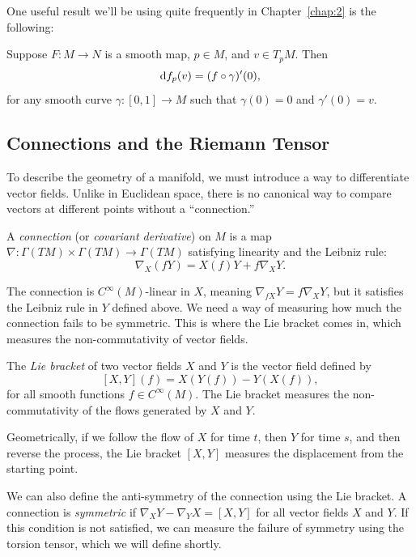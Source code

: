 
One useful result we'll be using quite frequently in Chapter~\ref{chap:2} is the following:

\begin{corollary}\label{cor:differential_of_a_map}
  Suppose $F : M \to N$ is a smooth map, $p \in M$, and $v \in T_pM$. Then
  \[%
    \df_p(v) = (f \circ \gamma)'(0)
  ,\]%
  for any smooth curve $\gamma : [0, 1] \to M$ such that $\gamma(0) = 0$ and $\gamma'(0) = v$.
\end{corollary}

\subsection{Connections and the Riemann Tensor} To describe the geometry of a manifold, we must introduce a way to differentiate vector fields. Unlike in Euclidean space, there is no canonical way to compare vectors at different points without a ``connection.''

\begin{definition}
  A \emph{connection} (or \emph{covariant derivative}) on $M$ is a map $\nabla : \Gamma(TM) \times \Gamma(TM) \to \Gamma(TM)$ satisfying linearity and the Leibniz rule:
  \[%
    \nabla_X (fY) = X(f) Y + f \nabla_X Y
  .\]%
\end{definition}

The connection is $C^\infty(M)$-linear in $X$, meaning $\nabla_{fX} Y = f\nabla_X Y$, but it satisfies the Leibniz rule in $Y$ defined above. We need a way of measuring how much the connection fails to be symmetric. This is where the Lie bracket comes in, which measures the non-commutativity of vector fields.

\begin{definition}
  The \emph{Lie bracket} of two vector fields $X$ and $Y$ is the vector field defined by
  \[%
    [X,Y](f) = X(Y(f)) - Y(X(f))
  ,\]%
  for all smooth functions $f \in C^\infty(M)$. The Lie bracket measures the non-commutativity of the flows generated by $X$ and $Y$.
\end{definition}

Geometrically, if we follow the flow of $X$ for time $t$, then $Y$ for time $s$, and then reverse the process, the Lie bracket $[X, Y]$ measures the displacement from the starting point.

We can also define the anti-symmetry of the connection using the Lie bracket. A connection is \emph{symmetric} if $\nabla_X Y - \nabla_Y X = [X,Y]$ for all vector fields $X$ and $Y$. If this condition is not satisfied, we can measure the failure of symmetry using the torsion tensor, which we will define shortly.

